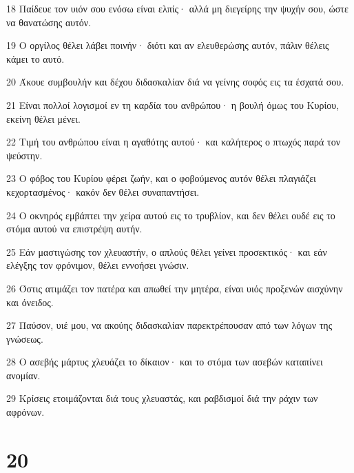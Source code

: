 \par 18 Παίδευε τον υιόν σου ενόσω είναι ελπίς· αλλά μη διεγείρης την ψυχήν σου, ώστε να θανατώσης αυτόν.
\par 19 Ο οργίλος θέλει λάβει ποινήν· διότι και αν ελευθερώσης αυτόν, πάλιν θέλεις κάμει το αυτό.
\par 20 Άκουε συμβουλήν και δέχου διδασκαλίαν διά να γείνης σοφός εις τα έσχατά σου.
\par 21 Είναι πολλοί λογισμοί εν τη καρδία του ανθρώπου· η βουλή όμως του Κυρίου, εκείνη θέλει μένει.
\par 22 Τιμή του ανθρώπου είναι η αγαθότης αυτού· και καλήτερος ο πτωχός παρά τον ψεύστην.
\par 23 Ο φόβος του Κυρίου φέρει ζωήν, και ο φοβούμενος αυτόν θέλει πλαγιάζει κεχορτασμένος· κακόν δεν θέλει συναπαντήσει.
\par 24 Ο οκνηρός εμβάπτει την χείρα αυτού εις το τρυβλίον, και δεν θέλει ουδέ εις το στόμα αυτού να επιστρέψη αυτήν.
\par 25 Εάν μαστιγώσης τον χλευαστήν, ο απλούς θέλει γείνει προσεκτικός· και εάν ελέγξης τον φρόνιμον, θέλει εννοήσει γνώσιν.
\par 26 Όστις ατιμάζει τον πατέρα και απωθεί την μητέρα, είναι υιός προξενών αισχύνην και όνειδος.
\par 27 Παύσον, υιέ μου, να ακούης διδασκαλίαν παρεκτρέπουσαν από των λόγων της γνώσεως.
\par 28 Ο ασεβής μάρτυς χλευάζει το δίκαιον· και το στόμα των ασεβών καταπίνει ανομίαν.
\par 29 Κρίσεις ετοιμάζονται διά τους χλευαστάς, και ραβδισμοί διά την ράχιν των αφρόνων.

\chapter{20}

